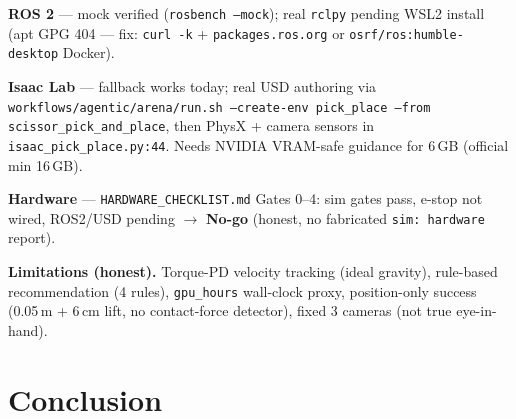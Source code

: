 \documentclass[11pt,a4paper,twocolumn]{article}
\begin{document}
\begin{center}
\end{center}

\textbf{ROS 2} --- mock verified (\texttt{rosbench --mock}); real \texttt{rclpy} pending WSL2 install (apt GPG 404 --- fix: \texttt{curl -k} + \texttt{packages.ros.org} or \texttt{osrf/ros:humble-desktop} Docker).

\textbf{Isaac Lab} --- fallback works today; real USD authoring via \texttt{workflows/agentic/arena/run.sh --create-env pick\_place --from scissor\_pick\_and\_place}, then PhysX + camera sensors in \texttt{isaac\_pick\_place.py:44}. Needs NVIDIA VRAM-safe guidance for 6\,GB (official min 16\,GB).

\textbf{Hardware} --- \texttt{HARDWARE\_CHECKLIST.md} Gates 0--4: sim gates pass, e-stop not wired, ROS2/USD pending $\rightarrow$ \textbf{No-go} (honest, no fabricated \texttt{sim: hardware} report).

\textbf{Limitations (honest).} Torque-PD velocity tracking (ideal gravity), rule-based recommendation (4 rules), \texttt{gpu\_hours} wall-clock proxy, position-only success (0.05\,m + 6\,cm lift, no contact-force detector), fixed 3 cameras (not true eye-in-hand).

\section{Conclusion}
\end{document}
